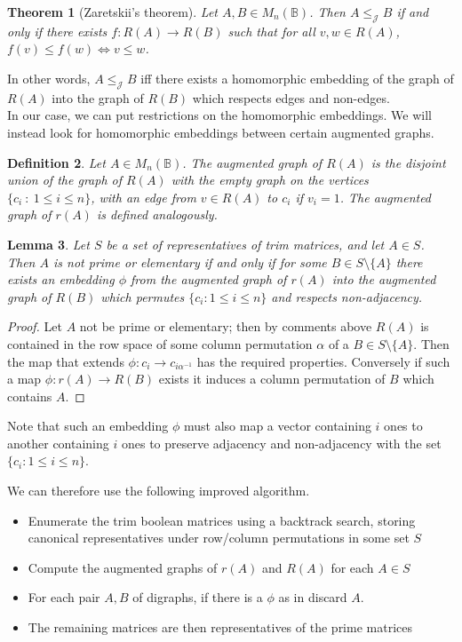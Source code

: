 \documentclass[11pt]{article}
\newtheorem{thm}{Theorem}[section]
\newtheorem{lemma}[thm]{Lemma}
\newtheorem{defi}[thm]{Definition}
\numberwithin{equation}{section}
\renewcommand{\to}{\longrightarrow}
\newcommand{\B}{\mathbb{B}}
\newcommand{\Bn}{M_n(\B)}
\newcommand{\J}{\mathscr{J}}
\begin{document}
\begin{thm}[Zaretskii's theorem]
  Let $A, B \in \Bn$. Then $A \leq_{\J} B$ if and only if there exists 
  $f: R(A) \to R(B)$ such that for all $v, w \in R(A)$, $f(v) \leq f(w) \iff
  v \leq w$.
\end{thm}

In other words, $A \leq_{\J} B$ iff there exists a homomorphic embedding of the 
graph of $R(A)$ into the graph of $R(B)$ which respects edges and non-edges. \\

In our case, we can put restrictions on the homomorphic embeddings. We will instead
look for homomorphic embeddings between certain augmented graphs.

\begin{defi}
  Let $A \in \Bn$. The \emph{augmented graph of $R(A)$} is the disjoint union of the graph of $R(A)$ with the empty graph on the vertices $\{c_i \: : \: 1 \leq i \leq n\}$, with an edge from $v \in R(A)$ to $c_i$ if $v_i = 1$. The \emph{augmented graph of $r(A)$} is defined analogously.
\end{defi}

\begin{lemma}
  Let $S$ be a set of representatives of trim matrices, and let $A \in S$. Then $A$ is not prime or elementary if and only if for some $B \in S\setminus \{A\}$ there exists an embedding $\phi$ from the augmented graph of $r(A)$ into the augmented graph of $R(B)$ which permutes $\{ c_i : 1 \leq i \leq n \}$ and respects non-adjacency.
\end{lemma}
\begin{proof}
  Let $A$ not be prime or elementary; then by comments above $R(A)$ is contained in the row space of some column permutation $\alpha$ of a $B \in S \setminus \{A\}$. Then the map that extends $\phi : c_i \to c_{i\alpha^{-1}}$ has the required properties. Conversely if such a map $\phi : r(A) \to R(B)$ exists it induces a column permutation of $B$ which contains $A$. 
\end{proof}

Note that such an embedding $\phi$ must also map a vector containing $i$ ones to another containing $i$ ones to preserve adjacency and non-adjacency with the set $\{ c_i : 1 \leq i \leq n \}$.

We can therefore use the following improved algorithm.
\begin{itemize}
  \item
    Enumerate the trim boolean matrices using a backtrack search, storing 
    canonical representatives under row/column permutations in some set $S$
  \item 
    Compute the augmented graphs of $r(A)$ and $R(A)$ for each $A \in S$
  \item 
    For each pair $A, B$ of digraphs, if there is a $\phi$ as in  discard $A$.
  \item
    The remaining matrices are then representatives of the prime matrices
\end{itemize}
\end{document}
